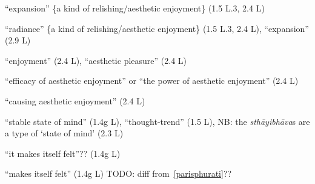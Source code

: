 \documentclass[10pt]{article}
\begin{document}
\begin{multicols}{2}
\begin{enumerate}[
			leftmargin=0em,
			rightmargin=0em,
		]
		 ``expansion'' \{a kind of relishing/aesthetic enjoyment\} (1.5 L.3, 2.4 L)

		 ``radiance'' \{a kind of relishing/aesthetic enjoyment\} (1.5 L.3, 2.4 L),
		``expansion'' (2.9 L)

		 ``enjoyment'' (2.4 L),
		``aesthetic pleasure'' (2.4 L)

		 ``efficacy of aesthetic enjoyment'' or ``the power of aesthetic enjoyment'' (2.4 L) %

		 ``causing aesthetic enjoyment'' (2.4 L)

		 ``stable state of mind'' (1.4g L),
		``thought-trend'' (1.5 L), %
		NB: the \textit{sthāyibhāva}s are a type of `state of mind' (2.3 L)

		 ``it makes itself felt''?? (1.4g L)

		 ``makes itself felt'' (1.4g L) TODO: diff from~\ref{parisphurati}??


\end{enumerate}
\end{multicols}
\end{document}
